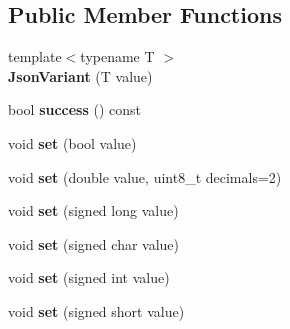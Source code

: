 \subsection*{Public Member Functions}
\begin{DoxyCompactItemize}
\item 
\hypertarget{class_arduino_json_1_1_json_variant_ae2c6bb2ba0ae85158bcec704c56ee15d}{}{\footnotesize template$<$typename T $>$ }\\{\bfseries Json\+Variant} (T value)\label{class_arduino_json_1_1_json_variant_ae2c6bb2ba0ae85158bcec704c56ee15d}

\item 
\hypertarget{class_arduino_json_1_1_json_variant_a37973a23ba2d09024b69b77a845822f2}{}bool {\bfseries success} () const \label{class_arduino_json_1_1_json_variant_a37973a23ba2d09024b69b77a845822f2}

\item 
\hypertarget{class_arduino_json_1_1_json_variant_a5ff18fdba8ce245bc2019312e99a04db}{}void {\bfseries set} (bool value)\label{class_arduino_json_1_1_json_variant_a5ff18fdba8ce245bc2019312e99a04db}

\item 
\hypertarget{class_arduino_json_1_1_json_variant_ab7c02236c9bb43628115fa5fcb0cca9c}{}void {\bfseries set} (double value, uint8\+\_\+t decimals=2)\label{class_arduino_json_1_1_json_variant_ab7c02236c9bb43628115fa5fcb0cca9c}

\item 
\hypertarget{class_arduino_json_1_1_json_variant_a329666228b5a5979a2fd33b761379ffe}{}void {\bfseries set} (signed long value)\label{class_arduino_json_1_1_json_variant_a329666228b5a5979a2fd33b761379ffe}

\item 
\hypertarget{class_arduino_json_1_1_json_variant_ab66d2559a08cb01b5d508cacb799e481}{}void {\bfseries set} (signed char value)\label{class_arduino_json_1_1_json_variant_ab66d2559a08cb01b5d508cacb799e481}

\item 
\hypertarget{class_arduino_json_1_1_json_variant_a59c1ea0167c7b365b284b3524fe94556}{}void {\bfseries set} (signed int value)\label{class_arduino_json_1_1_json_variant_a59c1ea0167c7b365b284b3524fe94556}

\item 
\hypertarget{class_arduino_json_1_1_json_variant_a54269623964ff70cb0f4c76b7e93e83e}{}void {\bfseries set} (signed short value)\label{class_arduino_json_1_1_json_variant_a54269623964ff70cb0f4c76b7e93e83e}


\end{DoxyCompactItemize}
